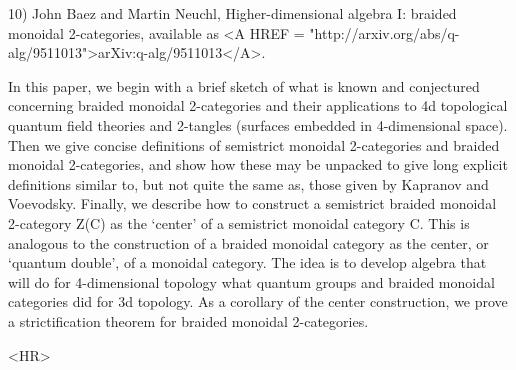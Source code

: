 10) John Baez and Martin Neuchl, Higher-dimensional algebra I: braided
monoidal 2-categories, available as <A HREF =
"http://arxiv.org/abs/q-alg/9511013">arXiv:q-alg/9511013</A>.

In this paper, we begin with a brief sketch of what is known and
conjectured concerning 
braided monoidal 2-categories and their applications to 4d topological
quantum field theories and 2-tangles (surfaces embedded in 4-dimensional
space).  Then we give concise definitions of semistrict monoidal
2-categories and braided monoidal 2-categories, and show how these may
be unpacked to give long explicit definitions similar to, but not quite
the same as, those given by Kapranov and Voevodsky.  Finally, we describe
how to construct a semistrict braided monoidal 2-category Z(C) as the
`center' of a semistrict monoidal category C.  This is analogous to the
construction of a braided monoidal category as the center, or `quantum
double', of a monoidal category.  The idea is to develop algebra that
will do for 4-dimensional topology what quantum groups and braided
monoidal categories did for 3d topology.  As a corollary of the center
construction, we prove a strictification theorem for braided monoidal
2-categories.   

<HR>



